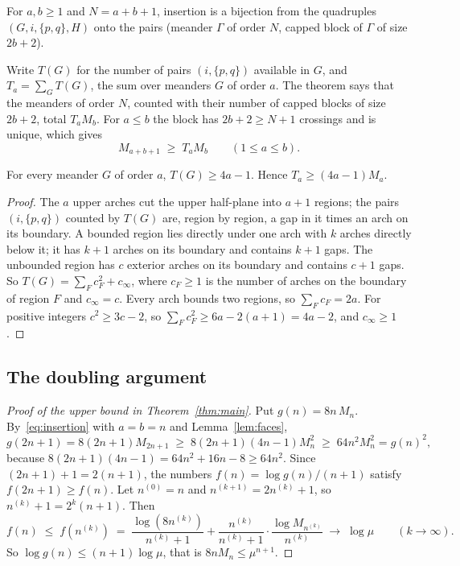 \begin{theorem}\label{thm:insertion}
For $a,b\ge1$ and $N=a+b+1$, insertion is a bijection from the quadruples $(G,i,\{p,q\},H)$ onto the
pairs (meander $\Gamma$ of order $N$, capped block of $\Gamma$ of size $2b+2$).
\end{theorem}

Write $T(G)$ for the number of pairs $(i,\{p,q\})$ available in $G$, and $T_a=\sum_G T(G)$, the sum over
meanders $G$ of order $a$. The theorem says that the meanders of order $N$, counted with their number of capped
blocks of size $2b+2$, total $T_aM_b$. For $a\le b$ the block has $2b+2\ge N+1$ crossings and is
unique, which gives
\begin{equation}\label{eq:insertion}
M_{a+b+1}\;\ge\;T_aM_b\qquad(1\le a\le b).
\end{equation}

\begin{lemma}\label{lem:faces}
For every meander $G$ of order $a$, $T(G)\ge4a-1$. Hence $T_a\ge(4a-1)M_a$.
\end{lemma}

\begin{proof}
The $a$ upper arches cut the upper half-plane into $a+1$ regions; the pairs $(i,\{p,q\})$ counted by
$T(G)$ are, region by region, a gap in it times an arch on its boundary. A bounded region lies directly
under one arch with $k$ arches directly below it; it has $k+1$ arches on its boundary and contains
$k+1$ gaps. The unbounded region has $c$ exterior arches on its boundary and contains $c+1$ gaps. So
$T(G)=\sum_F c_F^2+c_\infty$, where $c_F\ge1$ is the number of arches on the boundary of region $F$
and $c_\infty=c$. Every arch bounds two regions, so $\sum_Fc_F=2a$. For positive integers
$c^2\ge3c-2$, so $\sum_Fc_F^2\ge 6a-2(a+1)=4a-2$, and $c_\infty\ge1$.
\end{proof}

\subsection{The doubling argument}

\begin{proof}[Proof of the upper bound in Theorem~\ref{thm:main}]
Put $g(n)=8n\,M_n$. By~\eqref{eq:insertion} with $a=b=n$ and Lemma~\ref{lem:faces},
\[ g(2n+1)=8(2n+1)M_{2n+1}\;\ge\;8(2n+1)(4n-1)M_n^2\;\ge\;64n^2M_n^2=g(n)^2 , \]
because $8(2n+1)(4n-1)=64n^2+16n-8\ge64n^2$. Since $(2n+1)+1=2(n+1)$, the numbers
$f(n)=\log g(n)/(n+1)$ satisfy $f(2n+1)\ge f(n)$. Let $n^{(0)}=n$ and $n^{(k+1)}=2n^{(k)}+1$, so
$n^{(k)}+1=2^k(n+1)$. Then
\[ f(n)\;\le\;f(n^{(k)})\;=\;\frac{\log(8n^{(k)})}{n^{(k)}+1}+\frac{n^{(k)}}{n^{(k)}+1}\cdot\frac{\log M_{n^{(k)}}}{n^{(k)}}
\;\longrightarrow\;\log\mu \qquad(k\to\infty). \]
So $\log g(n)\le(n+1)\log\mu$, that is $8nM_n\le\mu^{n+1}$.
\end{proof}

